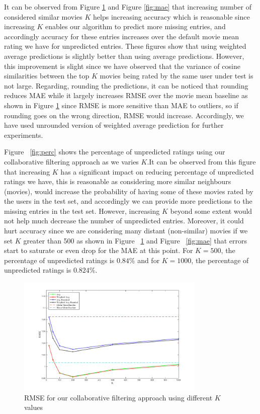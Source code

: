  It can be observed from Figure \ref{fig:rmse} and Figure \ref{fig:mae} that increasing number of considered similar movies $K$ helps increasing accuracy which is reasonable since increasing $K$ enables our algorithm to predict more missing entries, and accordingly accuracy for these entries increases over the default movie mean rating we have for unpredicted entries. These figures show that using weighted average predictions is slightly better than using average predictions. However, this improvement is slight since we have observed that the variance of cosine similarities between the top $K$ movies being rated by the same user under test is not large. Regarding, rounding the predictions, it can be noticed that rounding reduces MAE while it largely increases RMSE over the movie mean baseline as shown in Figure \ref{fig:rmse} since RMSE is more sensitive than MAE to outliers, so if rounding goes on the wrong direction, RMSE would increase. Accordingly, we have used unrounded version of weighted average prediction for further experiments.


Figure ~\ref{fig:perc} shows the percentage of unpredicted ratings using our collaborative filtering approach as we varies $K$.It can be observed from this figure that increasing $K$ has a significant impact on reducing percentage of unpredicted ratings we have, this is reasonable as considering more similar neighbours (movies), would increase the probability of having some of these movies rated by the users in the test set, and accordingly we can provide more predictions to the missing entries in the test set. However, increasing $K$ beyond some extent would not help much decrease the number of unpredicted entries. Moreover, it could hurt accuracy since we are considering many distant (non-similar) movies if we set $K$ greater than 500 as shown in Figure ~\ref{fig:rmse} and Figure ~\ref{fig:mae} that errors start to saturate or even drop for the MAE at this point. For $K=500$, the percentage of unpredicted ratings is $0.84\%$ and for $K=1000$, the percentage of unpredicted ratings is $0.824\%$. \\
\begin{figure}[!ht]
  \centering
  \includegraphics[width=0.8\textwidth]{images/rmse.png}
  \caption{RMSE for our collaborative filtering approach using different $K$ values}
  \label{fig:rmse}
\end{figure}

